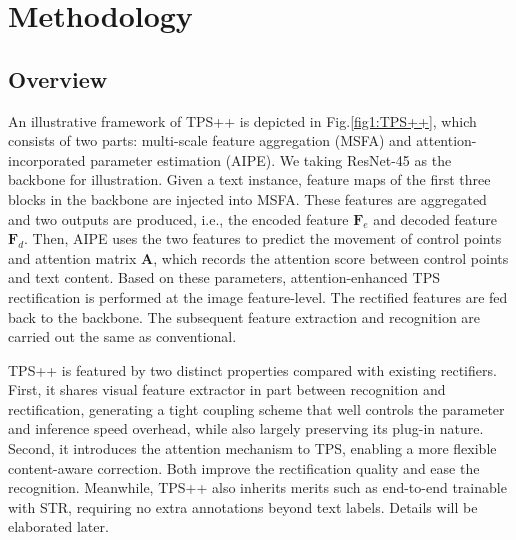 \documentclass{article}
\begin{document}
\section{Methodology}
\subsection{Overview}
An illustrative framework of TPS++ is depicted in Fig.\ref{fig1:TPS++}, which consists of two parts: multi-scale feature aggregation (MSFA) and attention-incorporated parameter estimation (AIPE). We taking ResNet-45 as the backbone for illustration. Given a text instance, feature maps of the first three blocks in the backbone are injected into MSFA. These features are aggregated and two outputs are produced, i.e., the encoded feature $\boldsymbol{F}_{e}$ and decoded feature $\boldsymbol{F}_{d}$. Then, AIPE uses the two features to predict the movement of control points and attention matrix $\boldsymbol{A}$, which records the attention score between control points and text content. Based on these parameters, attention-enhanced TPS rectification is performed at the image feature-level. The rectified features are fed back to the backbone. The subsequent feature extraction and recognition are carried out the same as conventional. 

TPS++ is featured by two distinct properties compared with existing rectifiers. First, it shares visual feature extractor in part between recognition and rectification, generating a tight coupling scheme that well controls the parameter and inference speed overhead, while also largely preserving its plug-in nature. Second, it introduces the attention mechanism to TPS, enabling a more flexible content-aware correction. Both improve the rectification quality and ease the recognition. Meanwhile, TPS++ also inherits merits such as end-to-end trainable with STR, requiring no extra annotations beyond text labels. Details will be elaborated later.
\end{document}
